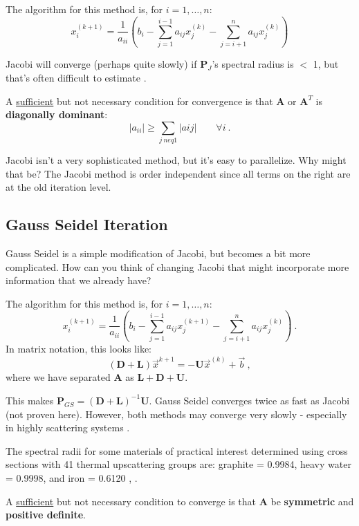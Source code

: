 \documentclass[12pt]{article}
\newcommand{\ve}[1]{\ensuremath{\mathbf{#1}}}
\begin{document}
The algorithm for this method is, for $i = 1, \dots, n$:
\[ x^{(k+1)}_i = \frac{1}{a_{ii}}(b_i - \sum_{j=1}^{i-1} a_{ij} x_j^{(k)} - \sum_{j=i+1}^{n} a_{ij} x_j^{(k)})\]

Jacobi will converge (perhaps quite slowly) if $\ve{P}_J$'s spectral radius is $<$ 1, but that's often difficult to estimate \cite{LeVeque2007}. 

A \underline{sufficient} but not necessary condition for convergence is that $\ve{A}$ or $\ve{A}^T$ is \textbf{diagonally dominant}:
%
\[|a_{ii}| \geq \sum_{j \ neq 1} |aij| \qquad \forall i \:.\]

Jacobi isn't a very sophisticated method, but it's easy to parallelize. Why might that be? The Jacobi method is order independent since all terms on the right are at the old iteration level. 


\subsection{Gauss Seidel Iteration}

Gauss Seidel is a simple modification of Jacobi, but becomes a bit more complicated. How can you think of changing Jacobi that might incorporate more information that we already have?

The algorithm for this method is, for $i = 1, \dots, n$:
\[ x^{(k+1)}_i = \frac{1}{a_{ii}}(b_i - \sum_{j=1}^{i-1} a_{ij} x_j^{(k+1)} - \sum_{j=i+1}^{n} a_{ij} x_j^{(k)}) \:.\]
%
In matrix notation, this looks like:
\[(\ve{D} + \ve{L})\vec{x}^{k+1} = -\ve{U} \vec{x}^{(k)} + \vec{b}\:, \]
where we have separated $\ve{A}$ as $\ve{L} + \ve{D} + \ve{U}$. 

This makes $\ve{P}_{GS} = (\ve{D} + \ve{L})^{-1}\ve{U}$. Gauss Seidel %
converges twice as fast as Jacobi (not proven here). However, both methods may converge very slowly - especially in highly scattering systems \cite{LeVeque2007}. 

The spectral radii for some materials of practical interest determined using cross sections with 41 thermal upscattering groups are: graphite = 0.9984, heavy water = 0.9998, and iron = 0.6120 \cite{Adams2002}, \cite{Evans2009d}.

A \underline{sufficient} but not necessary condition to converge is that $\ve{A}$ be \textbf{symmetric} and \textbf{positive definite}.
\end{document}
